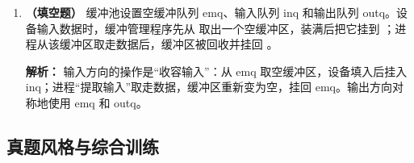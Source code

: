 \begin{enumerate}
\ifshowsolutions\par\noindent\textbf{解析：} 第一块必须依次经历 $T$、$M$、$C$，耗时 $50+10+40=100\,\mu\text{s}$。此后每增加一块，缓冲区被 $M$ 占用后设备才能输入下一块，而下一块的 $T$ 可与当前块的 $C$ 重叠，故稳态每块增加
\[
\max(C,T)+M=\max(40,50)+10=60\,\mu\text{s}.
\]
4 块总时间为
\[
100+(4-1)\times 60=280\,\mu\text{s}.
\]
\else \answerarea[8] \fi

\vspace{8pt}

\item \textbf{（填空题）} 缓冲池设置空缓冲队列 emq、输入队列 inq 和输出队列 outq。设备输入数据时，缓冲管理程序先从 \underline{\qquad} 取出一个空缓冲区，装满后把它挂到 \underline{\qquad}；进程从该缓冲区取走数据后，缓冲区被回收并挂回 \underline{\qquad}。

\ifshowsolutions\par\noindent\textbf{解析：} 输入方向的操作是“收容输入”：从 emq 取空缓冲区，设备填入后挂入 inq；进程“提取输入”取走数据，缓冲区重新变为空，挂回 emq。输出方向对称地使用 emq 和 outq。\else \answerarea \fi

\end{enumerate}

\subsection{真题风格与综合训练}

